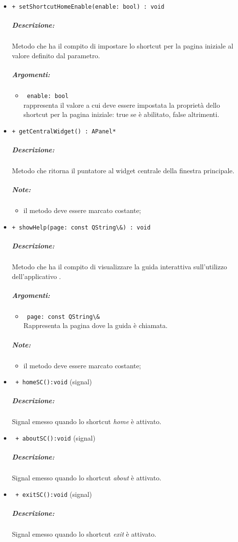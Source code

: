\begin{itemize}
\item \color{blue}\verb!+ setShortcutHomeEnable(enable: bool) : void !
\color{black}
\subparagraph{Descrizione: }
Metodo che ha il compito di impostare lo shortcut per la pagina iniziale al valore definito dal parametro.
\subparagraph{Argomenti:}
\begin{itemize}
\item \color{RoyalPurple} \verb! enable: bool! \\ rappresenta il valore a cui deve essere impostata la proprietà dello shortcut per la pagina iniziale: true se è abilitato, false altrimenti.
\end{itemize}
\color{black}

\item \color{blue}\verb!+ getCentralWidget() : APanel* !
\color{black}
\subparagraph{Descrizione: }
Metodo che ritorna il puntatore al widget centrale della finestra principale.
\subparagraph{Note:}
\begin{itemize}
\item il metodo deve essere marcato costante;
\end{itemize}

\item \color{blue}\verb!+ showHelp(page: const QString\&) : void !
\color{black}
\subparagraph{Descrizione: }
Metodo che ha il compito di visualizzare la guida interattiva sull'utilizzo dell'applicativo \project{}.
\subparagraph{Argomenti:}
\begin{itemize}
\item \color{RoyalPurple} \verb! page: const QString\& !\\ Rappresenta la pagina dove la guida è chiamata.
\end{itemize}
\subparagraph{Note:}
\begin{itemize}
\item il metodo deve essere marcato costante;
\end{itemize}

\item \color{blue}\verb! + homeSC():void! (signal)
\color{black} 
\subparagraph{Descrizione:} Signal\g{} emesso quando lo shortcut \textit{home} è attivato.

\item \color{blue}\verb! + aboutSC():void! (signal)
\color{black} 
\subparagraph{Descrizione:} Signal\g{} emesso quando lo shortcut \textit{about} è attivato.

\item \color{blue}\verb! + exitSC():void! (signal)
\color{black} 
\subparagraph{Descrizione:} Signal\g{} emesso quando lo shortcut \textit{exit} è attivato.


\end{itemize}
